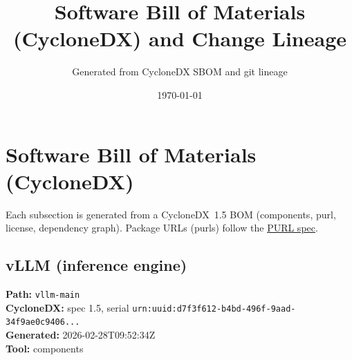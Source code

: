 \documentclass[11pt,a4paper]{article}
\title{\textbf{Software Bill of Materials (CycloneDX) and Change Lineage}}
\author{Generated from CycloneDX SBOM and git lineage}
\date{\today}
\begin{document}
\maketitle
\tableofcontents
\newpage
\section{Software Bill of Materials (CycloneDX)}
Each subsection is generated from a CycloneDX~1.5 BOM (components, purl, license, dependency graph). Package URLs (purls) follow the \href{https://github.com/package-url/purl-spec}{PURL spec}.

\subsection{vLLM (inference engine)}
\textbf{Path:} \texttt{vllm-main}
\\ \textbf{CycloneDX:} spec 1.5, serial \texttt{urn:uuid:d7f3f612-b4bd-496f-9aad-34f9ae0c9406...}
\\ \textbf{Generated:} 2026-02-28T09:52:34Z
\\ \textbf{Tool:} components
\end{document}
